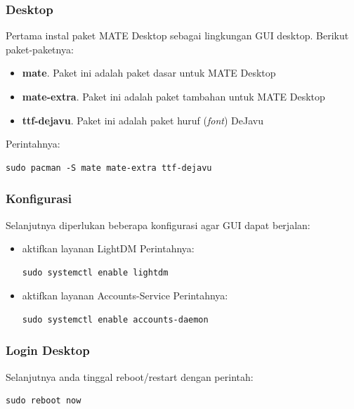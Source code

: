 \documentclass[12pt,]{article}
\begin{document}
	\subsubsection{Desktop}
	Pertama instal paket MATE Desktop sebagai lingkungan GUI desktop.
	Berikut paket-paketnya:
	\begin{itemize}
		\item \textbf{mate}. Paket ini adalah paket dasar untuk MATE Desktop
		\item \textbf{mate-extra}. Paket ini adalah paket tambahan untuk MATE Desktop
		\item \textbf{ttf-dejavu}. Paket ini adalah paket huruf (\textit{font}) DeJavu
	\end{itemize}
	Perintahnya:
	\begin{verbatim}
sudo pacman -S mate mate-extra ttf-dejavu
	\end{verbatim}
	
	\subsubsection{Konfigurasi}
	Selanjutnya diperlukan beberapa konfigurasi agar GUI dapat berjalan:
	\begin{itemize}
		\item aktifkan layanan LightDM
		Perintahnya:
		\begin{verbatim}
sudo systemctl enable lightdm
		\end{verbatim}
		
		\item aktifkan layanan Accounts-Service
		Perintahnya:
		\begin{verbatim}
sudo systemctl enable accounts-daemon
		\end{verbatim}
	\end{itemize}

	\subsubsection{Login Desktop}
	Selanjutnya anda tinggal reboot/restart dengan perintah:
	\begin{verbatim}
sudo reboot now
	\end{verbatim}	
	
\end{document}
